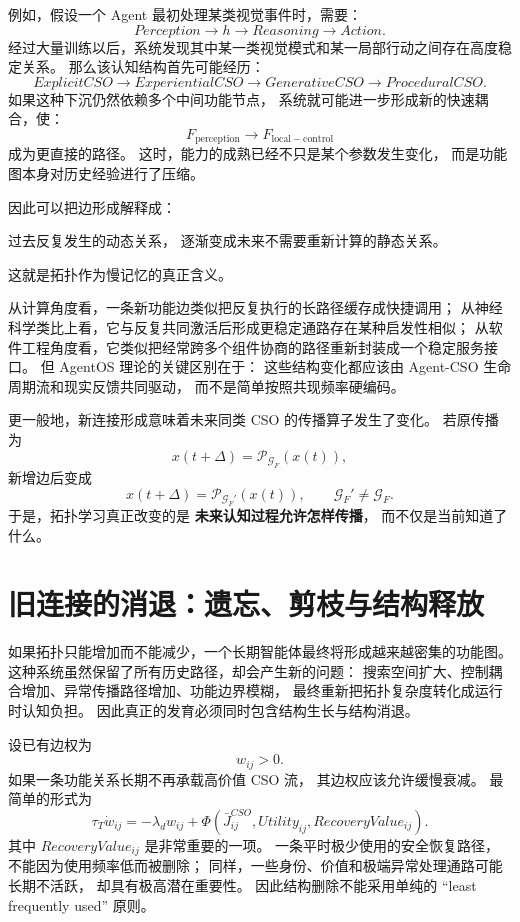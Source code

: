 例如，假设一个 Agent 最初处理某类视觉事件时，需要：
\[
Perception
\rightarrow
h
\rightarrow
Reasoning
\rightarrow
Action.
\]
经过大量训练以后，系统发现其中某一类视觉模式和某一局部行动之间存在高度稳定关系。
那么该认知结构首先可能经历：
\[
ExplicitCSO
\rightarrow
ExperientialCSO
\rightarrow
GenerativeCSO
\rightarrow
ProceduralCSO.
\]
如果这种下沉仍然依赖多个中间功能节点，
系统就可能进一步形成新的快速耦合，使：
\[
F_{\mathrm{perception}}
\rightarrow
F_{\mathrm{local-control}}
\]
成为更直接的路径。
这时，能力的成熟已经不只是某个参数发生变化，
而是功能图本身对历史经验进行了压缩。

因此可以把边形成解释成：
\begin{statementbox}
过去反复发生的动态关系，
逐渐变成未来不需要重新计算的静态关系。
\end{statementbox}
这就是拓扑作为慢记忆的真正含义。

从计算角度看，一条新功能边类似把反复执行的长路径缓存成快捷调用；
从神经科学类比上看，它与反复共同激活后形成更稳定通路存在某种启发性相似；
从软件工程角度看，它类似把经常跨多个组件协商的路径重新封装成一个稳定服务接口。
但 AgentOS 理论的关键区别在于：
这些结构变化都应该由 Agent-CSO 生命周期流和现实反馈共同驱动，
而不是简单按照共现频率硬编码。

更一般地，新连接形成意味着未来同类 CSO 的传播算子发生了变化。
若原传播为
\[
x(t+\Delta)
=
\mathcal P_{\mathcal G_F}(x(t)),
\]
新增边后变成
\[
x(t+\Delta)
=
\mathcal P_{\mathcal G_F'}(x(t)),
\qquad
\mathcal G_F'\neq\mathcal G_F.
\]
于是，拓扑学习真正改变的是
\textbf{未来认知过程允许怎样传播}，
而不仅是当前知道了什么。

\section{旧连接的消退：遗忘、剪枝与结构释放}

如果拓扑只能增加而不能减少，一个长期智能体最终将形成越来越密集的功能图。
这种系统虽然保留了所有历史路径，却会产生新的问题：
搜索空间扩大、控制耦合增加、异常传播路径增加、功能边界模糊，
最终重新把拓扑复杂度转化成运行时认知负担。
因此真正的发育必须同时包含结构生长与结构消退。

设已有边权为
\[
w_{ij}>0.
\]
如果一条功能关系长期不再承载高价值 CSO 流，
其边权应该允许缓慢衰减。
最简单的形式为
\[
\tau_T\dot w_{ij}
=
-\lambda_d w_{ij}
+
\Phi
\left(
\bar J_{ij}^{CSO},
Utility_{ij},
RecoveryValue_{ij}
\right).
\]
其中 $RecoveryValue_{ij}$ 是非常重要的一项。
一条平时极少使用的安全恢复路径，不能因为使用频率低而被删除；
同样，一些身份、价值和极端异常处理通路可能长期不活跃，
却具有极高潜在重要性。
因此结构删除不能采用单纯的 ``least frequently used'' 原则。

